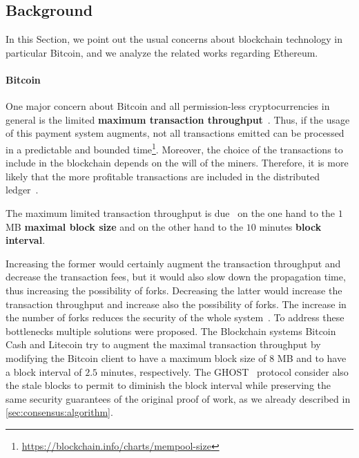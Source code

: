 \subsection{Background}
\label{sec:background}

In this Section, we point out the usual concerns about blockchain technology in
particular Bitcoin, and we analyze the related works regarding Ethereum.

\paragraph{Bitcoin} One major concern about Bitcoin and all permission-less
cryptocurrencies in general is the limited \textbf{maximum transaction
throughput}~\cite{bib:blockchain-challenges-opportunites-survey, bib:taxonomy,
bib:scaling-croman}. Thus, if the usage of this payment system augments, not all
transactions emitted can be processed in a predictable and bounded
time\footnote{\url{https://blockchain.info/charts/mempool-size}}. Moreover, the
choice of the transactions to include in the blockchain depends on the will of
the miners. Therefore, it is more likely that the more profitable transactions
are included in the distributed
ledger~\cite{bib:blockchain-challenges-opportunites-survey,wood2018ethereum}.

The maximum limited transaction throughput is due~\cite{bib:ghost,
bib:scaling-croman} on the one hand to the $1$ MB \textbf{maximal block size}
and on the other hand to the $10$ minutes \textbf{block interval}.

Increasing the former would certainly augment the transaction throughput and
decrease the transaction fees, but it would also slow down the propagation time,
thus increasing the possibility of forks. Decreasing the latter would increase
the transaction throughput and increase also the possibility of forks. The
increase in the number of forks reduces the security of the whole
system~\cite{bib:ghost}. To address these bottlenecks multiple solutions were
proposed. The Blockchain systems Bitcoin Cash and Litecoin try to augment the
maximal transaction throughput by modifying the Bitcoin client to have a maximum
block size of $8$ MB and to have a block interval of $2.5$ minutes,
respectively. The GHOST~\cite{bib:ghost} protocol consider also the stale blocks
to permit to diminish the block interval while preserving the same security
guarantees of the original proof of work, as we already described in
\autoref{sec:consensus:algorithm}.


